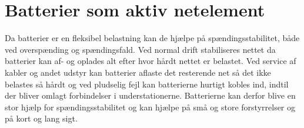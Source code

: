 \section{Batterier som aktiv netelement}

Da batterier er en fleksibel belastning kan de hjælpe på spændingsstabilitet, både ved overspænding og spændingsfald. Ved normal drift stabiliseres nettet da batterier kan af- og oplades alt efter hvor hårdt nettet er belastet. Ved service af kabler og andet udstyr kan batterier aflaste det resterende net så det ikke belastes så hårdt og ved pludselig fejl kan batterierne hurtigt kobles ind, indtil der bliver omlagt forbindelser i understationerne. Batterierne kan derfor blive en stor hjælp for spændingsstabilitet og kan hjælpe på små og store forstyrrelser og på kort og lang sigt.